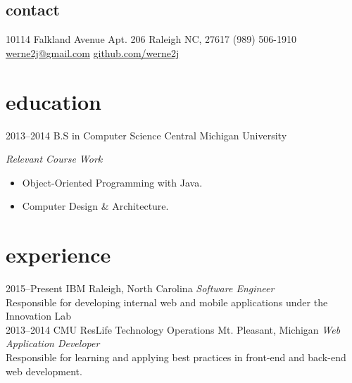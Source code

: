 \documentclass[]{friggeri-cv} %
\begin{document}


\begin{aside} %
\section{contact}
10114 Falkland Avenue Apt. 206
Raleigh NC, 27617
(989) 506-1910
~
\href{mailto:werne2@gmail.com}{werne2j@gmail.com}
\href{github.com/werne2j}{github.com/werne2j}
\end{aside}


\section{education}

\begin{entrylist}
\entry
{2013--2014}
{B.S in Computer Science{\normalfont}}
{Central Michigan University}
{\emph{Relevant Course Work}
\begin{itemize}
\item Object-Oriented Programming with Java.
\item Computer Design \& Architecture.
\end{itemize}}
\end{entrylist}


\section{experience}

\begin{entrylist}
\entry
{2015--Present}
{IBM}
{Raleigh, North Carolina}
{\emph{Software Engineer} \\
Responsible for developing internal web and mobile applications under the Innovation Lab}\\

\entry
{2013--2014}
{CMU ResLife Technology Operations}
{Mt. Pleasant, Michigan}
{\emph{Web Application Developer} \\
Responsible for learning and applying best practices in front-end and back-end web development.}\\

\end{entrylist}
\end{document}

